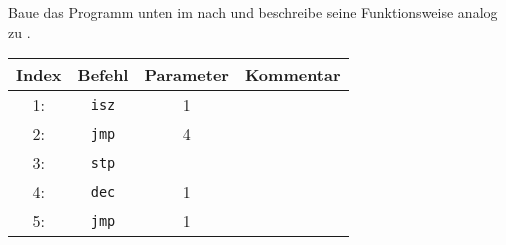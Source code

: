 \documentclass[10pt, a4paper, ngerman]{arbeitsblatt}
\begin{document}
\begin{aufgabe}[icon=\iconComputer]
	Baue das Programm unten im  nach und beschreibe seine Funktionsweise analog zu .

	\begin{center}
	\begin{tabularx}{.8\textwidth}{|c|c|c|X|}\hline
		\rowcolor{ab.tabelle.kopf.hg}
		Index & Befehl & Parameter & Kommentar \\\hline
		1: & \texttt{isz} & 1 & \Zeilenabstand\\\hline
		2: & \texttt{jmp} & 4 & \Zeilenabstand\\\hline
		3: & \texttt{stp} &   & \Zeilenabstand\\\hline
		4: & \texttt{dec} & 1 & \Zeilenabstand\\\hline
		5: & \texttt{jmp} & 1 & \Zeilenabstand\\\hline
	\end{tabularx}
	\end{center}
\end{aufgabe}
\end{document}
